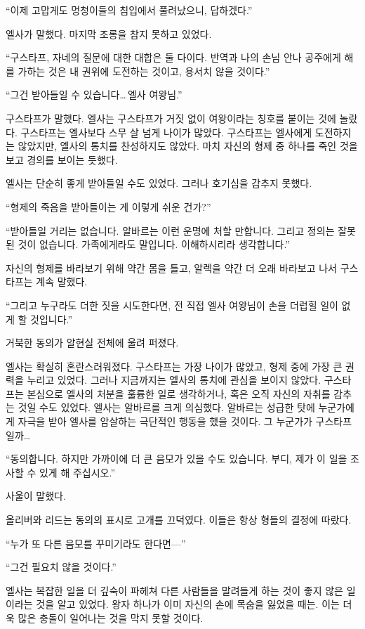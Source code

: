 ``이제 고맙게도 멍청이들의 침입에서 풀려났으니, 답하겠다.''

엘사가 말했다. 마지막 조롱을 참지 못하고 있었다.

``구스타프, 자네의 질문에 대한 대합은 둘 다이다. 반역과 나의 손님 안나 공주에게 해를 가하는 것은 내 권위에 도전하는 것이고, 용서치 않을 것이다.''

``그건 받아들일 수 있습니다\ldots\,엘사 여왕님.''

구스타프가 말했다. 엘사는 구스타프가 거짓 없이 여왕이라는 칭호를 붙이는 것에 놀랐다. 구스타프는 엘사보다 스무 살 넘게 나이가 많았다. 구스타프는 엘사에게 도전하지는 않았지만, 엘사의 통치를 찬성하지도 않았다. 마치 자신의 형제 중 하나를 죽인 것을 보고 경의를 보이는 듯했다.

엘사는 단순히 좋게 받아들일 수도 있었다. 그러나 호기심을 감추지 못했다.

``형제의 죽음을 받아들이는 게 이렇게 쉬운 건가?''

``받아들일 거리는 없습니다. 알바르는 이런 운명에 처할 만합니다. 그리고 정의는 잘못된 것이 없습니다. 가족에게라도 말입니다. 이해하시리라 생각합니다.''

자신의 형제를 바라보기 위해 약간 몸을 틀고, 알렉을 약간 더 오래 바라보고 나서 구스타프는 계속 말했다.

``그리고 누구라도 더한 짓을 시도한다면, 전 직접 엘사 여왕님이 손을 더럽힐 일이 없게 할 것입니다.''

거북한 동의가 알현실 전체에 울려 퍼졌다.

엘사는 확실히 혼란스러워졌다. 구스타프는 가장 나이가 많았고, 형제 중에 가장 큰 권력을 누리고 있었다. 그러나 지금까지는 엘사의 통치에 관심을 보이지 않았다. 구스타프는 본심으로 엘사의 처분을 훌륭한 일로 생각하거나, 혹은 오직 자신의 자취를 감추는 것일 수도 있었다. 엘사는 알바르를 크게 의심했다. 알바르는 성급한 탓에 누군가에게 자극을 받아 엘사를 암살하는 극단적인 행동을 했을 것이다. 그 누군가가 구스타프일까\ldots

``동의합니다. 하지만 가까이에 더 큰 음모가 있을 수도 있습니다. 부디, 제가 이 일을 조사할 수 있게 해 주십시오.''

사울이 말했다.

올리버와 리드는 동의의 표시로 고개를 끄덕였다. 이들은 항상 형들의 결정에 따랐다.

``누가 또 다른 음모를 꾸미기라도 한다면—''

``그건 필요치 않을 것이다.''

엘사는 복잡한 일을 더 깊숙이 파헤쳐 다른 사람들을 말려들게 하는 것이 좋지 않은 일이라는 것을 알고 있었다. 왕자 하나가 이미 자신의 손에 목숨을 잃었을 때는. 이는 더욱 많은 충돌이 일어나는 것을 막지 못할 것이다.

